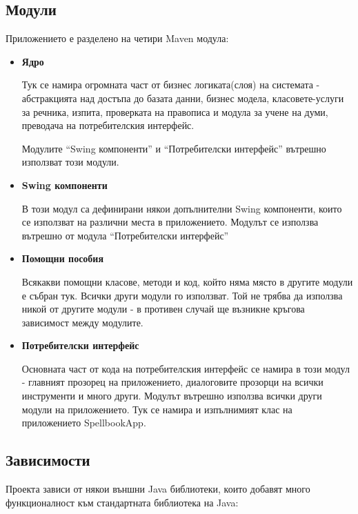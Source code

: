 \subsection{Модули}
Приложението е разделено на четири Maven модула:
\begin{itemize}
\item \textbf{Ядро}

Тук се намира огромната част от бизнес логиката(слоя) на системата -
абстракцията над достъпа до базата данни, бизнес модела,
класовете-услуги за речника, изпита, проверката на правописа и модула
за учене на думи, преводача на потребителския интерфейс.

Модулите "`Swing компоненти"' и "`Потребителски интерфейс"' вътрешно
използват този модули. 
\item \textbf{Swing компоненти}

В този модул са дефинирани някои допълнителни Swing компоненти, които
се използват на различни места в приложението. Модулът се използва
вътрешно от модула "`Потребителски интерфейс"'
\item \textbf{Помощни пособия}

Всякакви помощни класове, методи и код, който няма място в другите
модули е събран тук. Всички други модули го използват. Той не трябва
да използва никой от другите модули - в противен случай ще възникне
кръгова зависимост между модулите.
\item \textbf{Потребителски интерфейс}

Основната част от кода на потребителския интерфейс се намира в този
модул - главният прозорец на приложението, диалоговите прозорци на
всички инструменти и много други. Модулът вътрешно използва всички
други модули на приложението. Тук се намира и изпълнимият клас на
приложението SpellbookApp. 
\end{itemize}

\subsection{Зависимости}
Проекта зависи от някои външни Java библиотеки, които добавят много
функционалност към стандартната библиотека на Java:

